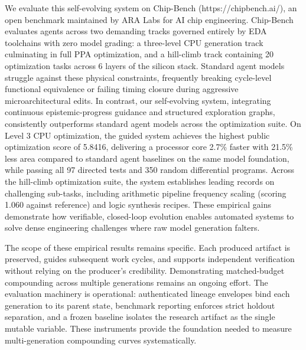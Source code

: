 We evaluate this self-evolving system on Chip-Bench (https://chipbench.ai/), an open benchmark maintained by ARA Labs for AI chip engineering. Chip-Bench evaluates agents across two demanding tracks governed entirely by EDA toolchains with zero model grading: a three-level CPU generation track culminating in full PPA optimization, and a hill-climb track containing 20 optimization tasks across 6 layers of the silicon stack. Standard agent models struggle against these physical constraints, frequently breaking cycle-level functional equivalence or failing timing closure during aggressive microarchitectural edits. In contrast, our self-evolving system, integrating continuous epistemic-progress guidance and structured exploration graphs, consistently outperforms standard agent models across the optimization suite. On Level 3 CPU optimization, the guided system achieves the highest public optimization score of 5.8416, delivering a processor core 2.7\% faster with 21.5\% less area compared to standard agent baselines on the same model foundation, while passing all 97 directed tests and 350 random differential programs. Across the hill-climb optimization suite, the system establishes leading records on challenging sub-tasks, including arithmetic pipeline frequency scaling (scoring 1.060 against reference) and logic synthesis recipes. These empirical gains demonstrate how verifiable, closed-loop evolution enables automated systems to solve dense engineering challenges where raw model generation falters.

The scope of these empirical results remains specific. Each produced artifact is preserved, guides subsequent work cycles, and supports independent verification without relying on the producer's credibility. Demonstrating matched-budget compounding across multiple generations remains an ongoing effort. The evaluation machinery is operational: authenticated lineage envelopes bind each generation to its parent state, benchmark reporting enforces strict holdout separation, and a frozen baseline isolates the research artifact as the single mutable variable. These instruments provide the foundation needed to measure multi-generation compounding curves systematically.
\fi
